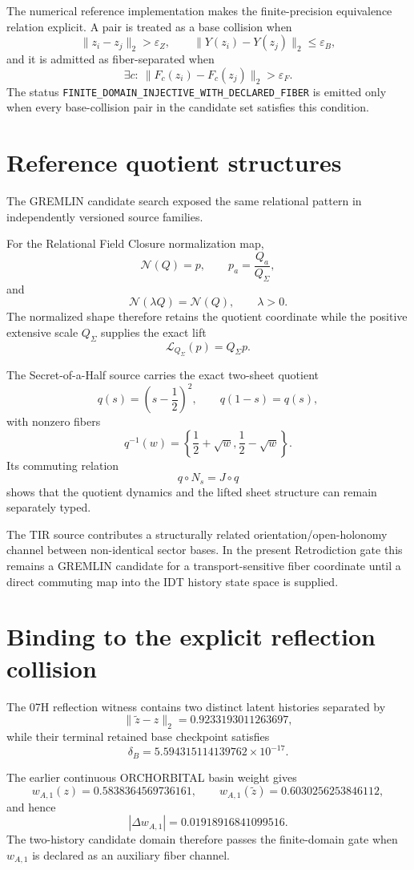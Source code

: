 The numerical reference implementation makes the finite-precision equivalence relation explicit.  A pair is treated as a base collision when
\[
\|z_i-z_j\|_2>\varepsilon_Z,
\qquad
\|Y(z_i)-Y(z_j)\|_2\le\varepsilon_B,
\]
and it is admitted as fiber-separated when
\[
\exists c:\
\|F_c(z_i)-F_c(z_j)\|_2>\varepsilon_F.
\]
The status
\texttt{FINITE\_DOMAIN\_INJECTIVE\_WITH\_DECLARED\_FIBER}
is emitted only when every base-collision pair in the candidate set satisfies this condition.

\section{Reference quotient structures}

The GREMLIN candidate search exposed the same relational pattern in independently versioned source families.

For the Relational Field Closure normalization map,
\[
\mathcal N(Q)=p,
\qquad
p_a=\frac{Q_a}{Q_\Sigma},
\]
and
\[
\mathcal N(\lambda Q)=\mathcal N(Q),
\qquad \lambda>0.
\]
The normalized shape therefore retains the quotient coordinate while the positive extensive scale $Q_\Sigma$ supplies the exact lift
\[
\mathcal L_{Q_\Sigma}(p)=Q_\Sigma p.
\]

The Secret-of-a-Half source carries the exact two-sheet quotient
\[
q(s)=\left(s-\frac12\right)^2,
\qquad
q(1-s)=q(s),
\]
with nonzero fibers
\[
q^{-1}(w)
=\left\{
\frac12+\sqrt w,
\frac12-\sqrt w
\right\}.
\]
Its commuting relation
\[
q\circ N_s=J\circ q
\]
shows that the quotient dynamics and the lifted sheet structure can remain separately typed.

The TIR source contributes a structurally related orientation/open-holonomy channel between non-identical sector bases.  In the present Retrodiction gate this remains a GREMLIN candidate for a transport-sensitive fiber coordinate until a direct commuting map into the IDT history state space is supplied.

\section{Binding to the explicit reflection collision}

The 07H reflection witness contains two distinct latent histories separated by
\[
\|\widetilde z-z\|_2
=0.9233193011263697,
\]
while their terminal retained base checkpoint satisfies
\[
\delta_B
=5.594315114139762\times10^{-17}.
\]

The earlier continuous ORCHORBITAL basin weight gives
\[
w_{A,1}(z)=0.5838364569736161,
\qquad
w_{A,1}(\widetilde z)=0.6030256253846112,
\]
and hence
\[
\boxed{
|\Delta w_{A,1}|=0.01918916841099516.
}
\]
The two-history candidate domain therefore passes the finite-domain gate when $w_{A,1}$ is declared as an auxiliary fiber channel.

